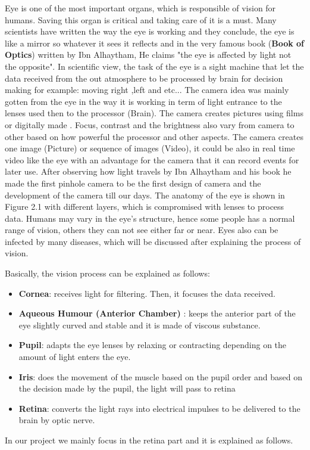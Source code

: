 Eye is one of the most important organs, which is responsible of vision for humans.
Saving this organ is critical and taking care of it is a must.
Many scientists have written the way the eye is working and they conclude, the eye is like a mirror so whatever it sees it reflects and in the very famous book (\textbf{Book of Optics}) \cite{alhazen1989book} written by Ibn Alhaytham, He claims "the eye is affected by light not the opposite".
In scientific view, the task of the eye is a sight machine that let the data received from the out atmosphere to be processed by brain for decision making for example: moving right ,left and etc... 
The camera idea was mainly gotten from the eye in the way it is working in term of light entrance to the lenses used then to the processor (Brain).
The camera creates pictures using films or digitally made \cite{abramoff2010retinal}.
Focus, contrast and the brightness also vary from camera to other based on how powerful the processor and other aspects.
The camera creates one image (Picture) or sequence of images (Video), it could be also in real time video like the eye with an advantage for the camera that it can record events for later use.
After observing how light travels by Ibn Alhaytham and his book he made the first pinhole camera to be the first design of camera and the development of the camera till our days.  
The anatomy of the eye is shown in Figure 2.1 with different layers, which is compromised with lenses to process data.
Humans may vary in the eye's structure, hence some people has a normal range of vision, others they can not see either far or near.
Eyes also can be infected by many diseases, which will be discussed after explaining the process of vision. 

Basically, the vision process can be explained as follows:
\begin{itemize}
\item \textbf{Cornea}: receives light for filtering.
Then, it focuses the data received.
\item \textbf{Aqueous Humour (Anterior Chamber)} : keeps the anterior part of the eye slightly curved and stable and it is made of viscous substance.
\item \textbf{Pupil}: adapts the eye lenses by relaxing or contracting depending on the amount of light enters the eye.
\item \textbf{Iris}: does the movement of the muscle based on the pupil order and based on the decision made by the pupil, the light will pass to retina
\item \textbf{Retina}: converts the light rays into electrical impulses to be delivered to the brain by optic nerve.

\end{itemize}
In our project we mainly focus in the retina part and it is explained as follows.

